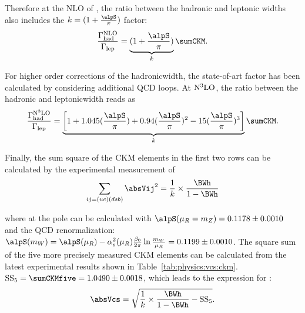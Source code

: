 \noindent Therefore at the NLO of \alpS, the ratio between the hadronic and leptonic \PW widths also includes the $k=(1+\frac{\alpS}{\pi})$ factor:
\begin{equation}
    \frac{\Gamma_{\rm had}^{\rm NLO}}{\Gamma_{\rm lep}} =  \underbrace{(1+\frac{\alpS}{\pi})}_{k} \sumCKM. %
\end{equation}


\noindent For higher order \alpS corrections of the hadronic\PW width, the state-of-art factor has been calculated by considering additional QCD loops. At $\rm N^3LO$, the ratio between the hadronic and leptonic\PW width reads as 
\begin{equation}
    \frac{\Gamma_{\rm had}^{\rm N^3LO}}{\Gamma_{\rm lep}} =   \underbrace{ \bigg [ 1+1.045 ( \frac{\alpS}{\pi} ) + 0.94  ( \frac{\alpS}{\pi} ) ^2 -15  ( \frac{\alpS}{\pi} ) ^3 \bigg ]}_{k} \sumCKM.
\end{equation}

\noindent Finally, the sum square of the CKM elements in the first two rows can be calculated by the experimental measurement of \BWh
\begin{equation}
    \sum_{ij=(uc)(dsb)} \absVij^2 = \frac{1}{k}\times \frac{\BWh }{1- \BWh}
\end{equation}



\noindent where \alpS at the \PW pole can be calculated with $\alpS(\mu_R = m_Z)=0.1178\pm0.0010$~\cite{pdg2020} and the QCD renormalization: $\alpS(m_W) = \alpS(\mu_R) - \alpha^2_s(\mu_R) \frac{ \beta_0}{2\pi} \ln \frac{m_W}{\mu_R} = 0.1199 \pm 0.0010$. The square sum of the five more precisely measured CKM elements can be calculated from the latest experimental results \cite{pdg2020} shown in Table~\ref{tab:physics:vcs:ckm}. $\mathrm{SS_5} = \sumCKMfive = 1.0490 \pm 0.0018$, which leads to the expression for \absVcs:
\begin{equation}
\absVcs = \sqrt{ \frac{1}{k}\times \frac{\BWh }{1- \BWh} - \mathrm{SS_5} } .
\end{equation}


